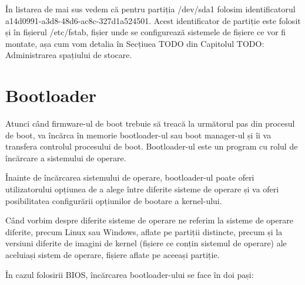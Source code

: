 
În listarea de mai sus vedem că pentru partiția /dev/sda1 folosim
identificatorul a14d0991-a3d8-48d6-ac8c-327d1a524501. Acest identificator de
partiție este folosit și în fișierul /etc/fstab, fișier unde se configurează
sistemele de fișiere ce vor fi montate, așa cum vom detalia în Secțiuea TODO din
Capitolul TODO: Administrarea spațiului de stocare.

\section{Bootloader}
\label{sec:boot-bootloader}

Atunci când firmware-ul de boot trebuie să treacă la următorul pas din procesul
de boot, va încărca în memorie bootloader-ul sau boot manager-ul și îi va
transfera controlul procesului de boot. Bootloader-ul este un program cu rolul
de încărcare a sistemului de operare.

Înainte de încărcarea sistemului  de operare, bootloader-ul poate oferi
utilizatorului opțiunea de a alege între diferite sisteme de operare și va oferi
posibilitatea configurării opțiunilor de bootare a kernel-ului.

Când vorbim despre diferite sisteme de operare ne referim la sisteme de operare
diferite, precum Linux sau Windows, aflate pe partiții distincte, precum și la
versiuni diferite de imagini de kernel (fișiere ce conțin sistemul de operare)
ale aceluiași sistem de operare, fișiere aflate pe aceeași partiție.

În cazul folosirii BIOS, încărcarea bootloader-ului se face în doi pași:

